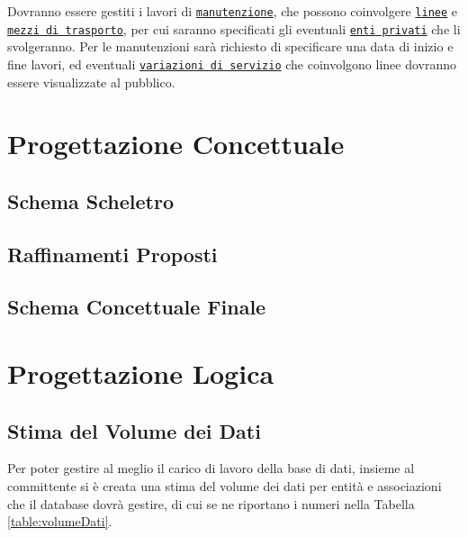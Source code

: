 \documentclass[12pt,a4paper]{report}
\begin{document}
Dovranno essere gestiti i lavori di \underline{\texttt{manutenzione}}, che possono coinvolgere \underline{\texttt{linee}} e \underline{\texttt{mezzi di trasporto}}, per cui saranno specificati gli eventuali \underline{\texttt{enti privati}} che li svolgeranno. Per le manutenzioni sarà richiesto di specificare una data di inizio e fine lavori, ed eventuali \underline{\texttt{variazioni di servizio}} che coinvolgono linee dovranno essere visualizzate al pubblico.

\chapter{Progettazione Concettuale}
\section{Schema Scheletro}
\section{Raffinamenti Proposti}
\section{Schema Concettuale Finale}

\chapter{Progettazione Logica}
\section{Stima del Volume dei Dati}
Per poter gestire al meglio il carico di lavoro della base di dati, insieme al committente si è creata una stima del volume dei dati per entità e associazioni che il database dovrà gestire, di cui se ne riportano i numeri nella Tabella \ref{table:volumeDati}.
\end{document}

